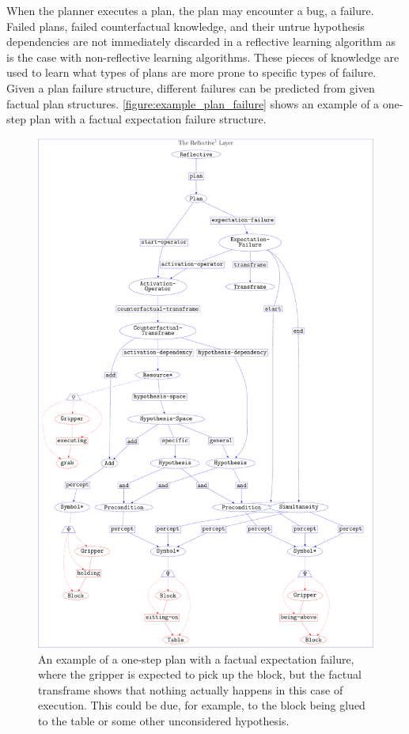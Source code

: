 When the planner executes a plan, the plan may encounter a bug, a
failure.  Failed plans, failed counterfactual knowledge, and their
untrue hypothesis dependencies are not immediately discarded in a
reflective learning algorithm as is the case with non-reflective
learning algorithms.  These pieces of knowledge are used to learn what
types of plans are more prone to specific types of failure.  Given a
plan failure structure, different failures can be predicted from given
factual plan structures.
{\mbox{\autoref{figure:example_plan_failure}}} shows an example of a
one-step plan with a factual expectation failure structure.
\begin{figure}
\hspace*{-4cm}\includegraphics[width=18cm]{gfx/example_plan_failure}
\caption[An example of a one-step plan with a factual expectation
  failure.]{An example of a one-step plan with a factual expectation
  failure, where the gripper is expected to pick up the block, but the
  factual transframe shows that nothing actually happens in this case
  of execution.  This could be due, for example, to the block being
  glued to the table or some other unconsidered hypothesis.}
\label{figure:example_plan_failure}
\end{figure}

